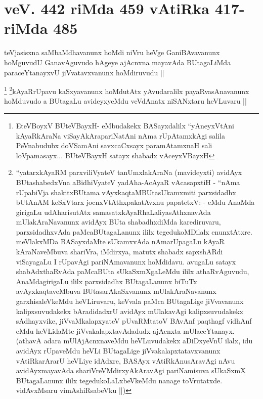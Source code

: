 
\section*{veV. 442 riMda 459 vAtiRka 417-riMda 485}

\begin{artha}
teVjasisxna saMbaMdhavanunx hoMdi niVru heVge GaniBAvavanunx hoMguvudU
GanavAguvudo hAgeye ajAcnxna mayavAda BUtagaLiMda paraceYtanayxvU
jiVvatavxvanunx hoMdiruvudu ||
\end{artha}


\begin{artha}
\footnote[1]{EteVBoyxV BUteVBayxH- eMbudakekx BASayxdalilx
  ``yAneyxVtAni kAyaRkAraNa viSayAkArapariNatAni nAma rUpAtamxkAgi
  salila PeVnabudubx doVSamAni savxcaCxsayx paramAtamxnaH sali
  loVpamasayx... BUteVBayxH satayx shabadx vAceyxVBayxH }
\footnote[2]{``yatarxkAyaRM parxviliVyateV tanUmxlakAraNa (mavideyxti)
avidAyx BUtashabedxVna aBidhiVyateV yadAha-AcAyaR vAcasapxtiH - ``nAma
rUpabiVja shakitxBUtama vAyxkaqtaMBUtasUkamxmiti parxsidadhx bUtAnAM
keSxVtarx jocnxVtAthxpakatAvxnu papatetxV: -
eMdu AnaMda girigaLu udAharisutAtx samasatxkAyaRhaLaliyasAthxnavAda
mUlakAraNavanunx avidAyx BUta shabadhxdiMda karediruvaru,
parxsidadhxvAda paMcaBUtagaLanunx ililx tegedukoMDilalx
enunxtAtxre. meVlakxMDa BASayxdaMte sUkamxvAda nAmarUpagaLu kAyaR
kAraNaveMbuva shariVra, iMdirxya, matutx shabadx sapxshARdi viSayagaLu
I rUpavAgi pariNAmavanunx hoMdidavu. avugaLu satayx shabAdxthaRvAda
paMcaBUta sUkaSxmXgaLeMdu ililx athaRvAguvudu, AnaMdagirigaLu ililx
parxsidadhx BUtagaLanunx biTuTx avAyxkaqtaveMbuva BUtasarAkaSxvanunx
mUlakAraNavanunx garxhisaleVkeMdu heVLiruvaru, keVvala paMca
BUtagaLige jiVvavanunx kalipxsuvudakekx bAradidadxrU avidAyx
mUlakavAgi kalipxsuvudakekx sAdhayxvike, jiVvaMkalapxyateV pUvaRMtatoV
BAvAnf paqthagf vidhAnf eMdu heVLidaMte jiVvakalapxtavAdadudx ajAcnxta
mUlaceYtanayx. (athavA adara mUlAjAcnxnaveMdu heVLuvudakekx aDiDxyeVnU
ilalx, idu avidAyx rUpaveMdu heVLi BUtagaLige jiVvakalapxtatavxvanunx
vAtiRkarArarU heVLiye idAdxre, BASAyx vAtiRkAnusAravAgi nAvu
avidAyxmayavAda shariVreVMdirxyAkAravAgi pariNamisuva sUkaSxmX
BUtagaLanunx ililx tegedukoLaLxbeVkeMdu nanage
toVrutatxde. vidAvxMsaru vimAshiRsabeVku ||)}kAyaRrUpavu kaSxyavanunx hoMdutAtx yAvudaralilx payaRvasAnavanunx
hoMduvudo a BUtagaLu avideyxyeMdu veVdAnatx niSANxtaru heVLuvaru ||
\end{artha}

